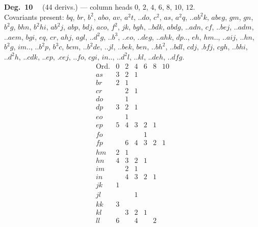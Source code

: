 \documentclass[11pt]{article}
\begin{document}
\noindent\textbf{Deg.~10} \ \ (44 derivs.) --- column heads $0$, $2$, $4$, $6$, $8$, $10$, $12$. \\
Covariants present: $bq$, $br$, $b^{2}$, $abo$, $av$, $a^{2}t$, $..do$, $c^{2}$, $as$, $a^{2}q$, $..ab^{2}k$, $abeg$, $gm$, $gn$, $b^{2}g$, $bhn$, $b^{2}hi$, $ab^{2}j$, $abp$, $bdj$, $aco$, $f^{2}$, $jk$, $bgh$, $..bdk$, $abdg$, $..adn$, $cf$, $..bej$, $..adm$, $..aem$, $bgi$, $eq$, $cr$, $ahj$, $agl$, $..d^{2}g$, $..b^{3}$, $..eo$, $..deg$, $..ahk$, $dp..$, $eh$, $hm..$, $..aij$, $..hn$, $b^{2}g$, $im..$, $..b^{2}p$, $b^{3}c$, $bcm$, $..b^{2}de$, $..jl$, $..bek$, $ben$, $..bh^{2}$, $..bdl$, $cdj$, $.bfj$, $cgh$, $..bhi$, $..d^{2}h$, $..cdk$, $..ep$, $.cej$, $..fo$, $cgi$, $in..$, $..d^{2}l$, $..kl$, $..deh$, $..dfg$.
\[
\begin{array}{l|cccccc}
\text{Ord.} & 0 & 2 & 4 & 6 & 8 & 10 \\\hline
as & 3 & 2 & 1 & & & \\
br & 2 & 1 & & & & \\
cr & & 2 & 1 & & & \\
do & & 1 & & & & \\
dp & 3 & 2 & 1 & & & \\
eo & & 1 & & & & \\
ep & 5 & 4 & 3 & 2 & 1 & \\
fo & & & & 1 & & \\
fp & & 6 & 4 & 3 & 2 & 1 \\
hm & 2 & 1 & & & & \\
hn & 4 & 3 & 2 & 1 & & \\
im & & 2 & 1 & & & \\
in & & 4 & 3 & 2 & 1 & \\
jk & 1 & & & & & \\
jl & & & 1 & & & \\
kk & 3 & & & & & \\
kl & & 3 & 2 & 1 & & \\
ll & 6 & & 4 & & 2 &
\end{array}
\]

\bigskip
\end{document}
